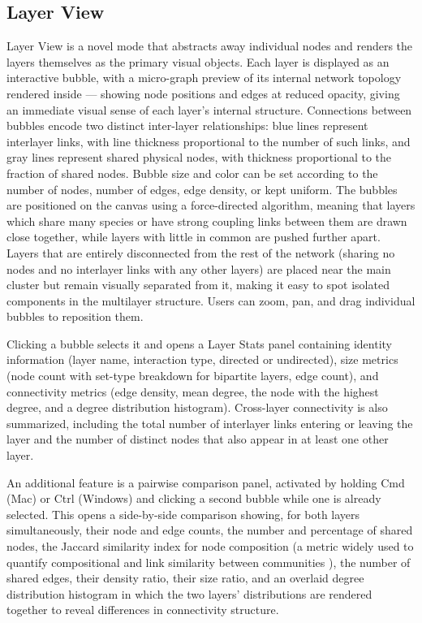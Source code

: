 \documentclass{article}
\begin{document}
\subsection{Layer View}

Layer View is a novel mode that abstracts away individual nodes and renders the layers themselves as the primary visual objects. Each layer is displayed as an interactive bubble, with a micro-graph preview of its internal network topology rendered inside — showing node positions and edges at reduced opacity, giving an immediate visual sense of each layer's internal structure. Connections between bubbles encode two distinct inter-layer relationships: blue lines represent interlayer links, with line thickness proportional to the number of such links, and gray lines represent shared physical nodes, with thickness proportional to the fraction of shared nodes. Bubble size and color can be set according to the number of nodes, number of edges, edge density, or kept uniform. The bubbles are positioned on the canvas using a force-directed algorithm, meaning that layers which share many species or have strong coupling links between them are drawn close together, while layers with little in common are pushed further apart. Layers that are entirely disconnected from the rest of the network (sharing no nodes and no interlayer links with any other layers) are placed near the main cluster but remain visually separated from it, making it easy to spot isolated components in the multilayer structure. Users can zoom, pan, and drag individual bubbles to reposition them.

Clicking a bubble selects it and opens a Layer Stats panel containing identity information (layer name, interaction type, directed or undirected), size metrics (node count with set-type breakdown for bipartite layers, edge count), and connectivity metrics (edge density, mean degree, the node with the highest degree, and a degree distribution histogram). Cross-layer connectivity is also summarized, including the total number of interlayer links entering or leaving the layer and the number of distinct nodes that also appear in at least one other layer. 

An additional feature is a pairwise comparison panel, activated by holding Cmd (Mac) or Ctrl (Windows) and clicking a second bubble while one is already selected. This opens a side-by-side comparison showing, for both layers simultaneously, their node and edge counts, the number and percentage of shared nodes, the Jaccard similarity index for node composition (a metric widely used to quantify compositional and link similarity between communities \cite{Poisot2012-hz}), the number of shared edges, their density ratio, their size ratio, and an overlaid degree distribution histogram in which the two layers' distributions are rendered together to reveal differences in connectivity structure.
\end{document}
